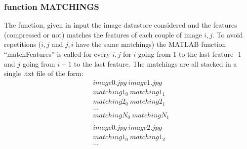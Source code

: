 \subsubsection{function MATCHINGS} \label{sec:MATCHINGS}
The function, given in input the image datastore considered and the features (compressed or not) matches the features of each couple of image $i,j$. To avoid repetitions ($i,j$ and $j,i$ have the same matchings) the MATLAB function ``matchFeatures'' is called for every $i,j$ for $i$ going from 1 to the last feature -1 and $j$ going from $i+1$ to the last feature. The matchings are all stacked in a single .txt file of the form:
\begin{align*}
& image0.jpg\ image1.jpg \\
& matching1_0\ matching1_1 \\
& matching2_0\ matching2_1 \\
& ... \\
& matchingN_0\ matchingN_1 \\
& \\
& image0.jpg\ image2.jpg \\
& matching1_0\ matching1_2 \\
& ...
\end{align*}  